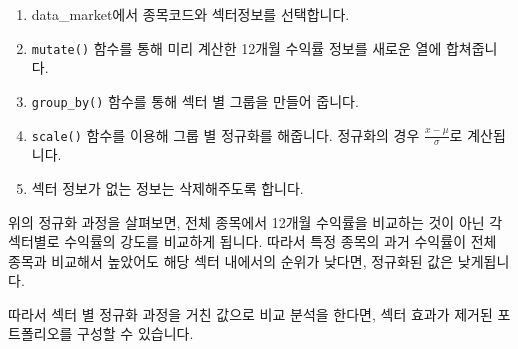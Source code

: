 \documentclass[12pt,]{book}
\newenvironment{Shaded}{\begin{snugshade}}{\end{snugshade}}
\newcommand{\DataTypeTok}[1]{\textcolor[rgb]{0.13,0.29,0.53}{#1}}
\newcommand{\KeywordTok}[1]{\textcolor[rgb]{0.13,0.29,0.53}{\textbf{#1}}}
\newcommand{\NormalTok}[1]{#1}
\newcommand{\OperatorTok}[1]{\textcolor[rgb]{0.81,0.36,0.00}{\textbf{#1}}}
\newcommand{\OtherTok}[1]{\textcolor[rgb]{0.56,0.35,0.01}{#1}}
\newcommand{\StringTok}[1]{\textcolor[rgb]{0.31,0.60,0.02}{#1}}
\providecommand{\tightlist}{%
  \setlength{\itemsep}{0pt}\setlength{\parskip}{0pt}}
\begin{document}
\begin{Shaded}
\end{Shaded}

\begin{enumerate}
\def\labelenumi{\arabic{enumi}.}
\tightlist
\item
  data\_market에서 종목코드와 섹터정보를 선택합니다.
\item
  \texttt{mutate()} 함수를 통해 미리 계산한 12개월 수익률 정보를 새로운 열에 합쳐줍니다.
\item
  \texttt{group\_by()} 함수를 통해 섹터 별 그룹을 만들어 줍니다.
\item
  \texttt{scale()} 함수를 이용해 그룹 별 정규화를 해줍니다. 정규화의 경우 \(\frac{x- \mu}{\sigma}\)로 계산됩니다.
\item
  섹터 정보가 없는 정보는 삭제해주도록 합니다.
\end{enumerate}

위의 정규화 과정을 살펴보면, 전체 종목에서 12개월 수익률을 비교하는 것이 아닌 각 섹터별로 수익률의 강도를 비교하게 됩니다. 따라서 특정 종목의 과거 수익률이 전체 종목과 비교해서 높았어도 해당 섹터 내에서의 순위가 낮다면, 정규화된 값은 낮게됩니다.

따라서 섹터 별 정규화 과정을 거친 값으로 비교 분석을 한다면, 섹터 효과가 제거된 포트폴리오를 구성할 수 있습니다.
\end{document}
